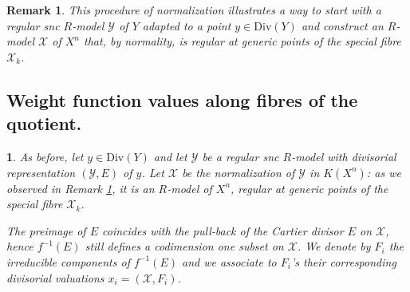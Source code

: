 \documentclass{amsart}%
\numberwithin{equation}{subsection}
\theoremstyle{plain2}
\theoremstyle{definition2}
\newtheorem{rem}[equation]{Remark}
\theoremstyle{stepstyle}
\theoremstyle{point}
\theoremstyle{subpoint}
\newtheorem{subpoint}[equation]{}%
\newcommand{\spa}[1]{\begin{subpoint}#1\end{subpoint}}           %
\newcommand{\cX}{\ensuremath{\mathscr{X}}}
\newcommand{\cY}{\ensuremath{\mathscr{Y}}}
\renewcommand{\cY}{\ensuremath{\mathscr{Y}}}
\begin{document}
\begin{rem} \label{rem divi repre quotient}
This procedure of normalization illustrates a way to start with a regular snc $R$-model $\cY$ of $Y$ adapted to a point $y \in \text{Div}(Y)$ and construct an $R$-model $\cX$ of $X^n$ that, by normality, is regular at generic points of the special fibre $\cX_k$. 
\end{rem}

\subsection{Weight function values along fibres of the quotient.} \label{paragraph weight values on fibres}
\spa{As before, let $y \in \text{Div}(Y)$ and let $\cY$ be a regular snc $R$-model with divisorial representation $(\cY,E)$ of $y$. %
Let $\cX$ be the normalization of $\cY$ in $K(X^n)$: as we observed in Remark \ref{rem divi repre quotient}, it is an $R$-model of $X^n$, regular at generic points of the special fibre $\cX_k$.

The preimage of $E$ coincides with the pull-back of the Cartier divisor $E$ on $\cX$, hence $f^{-1}(E)$ still defines a codimension one subset on $\cX$. We denote by $F_i$ the irreducible components of $f^{-1}(E)$ %
and we associate to $F_i$'s their corresponding divisorial valuations $x_i=(\cX,F_i)$.
}
\end{document}
